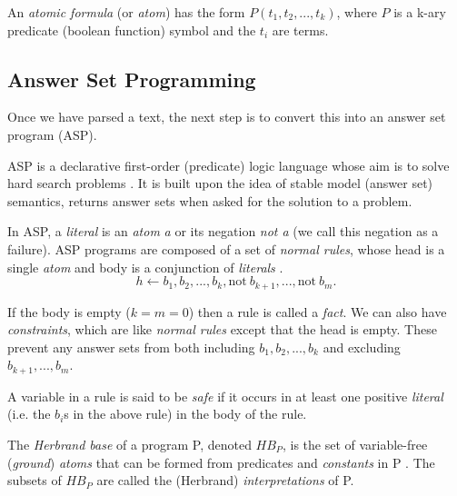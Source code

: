 \begin{definition}
An \textit{atomic formula} (or \textit{atom}) has the form $P(t_1,t_2,...,t_k)$, where $P$ is a k-ary predicate (boolean function) symbol and the $t_i$ are terms.
\end{definition}

\subsection{Answer Set Programming}

Once we have parsed a text, the next step is to convert this into an answer set program (ASP).

ASP is a declarative first-order (predicate) logic language whose aim is to solve hard search problems \cite{lifschitz_what_nodate}. It is built upon the idea of stable model (answer set) semantics, returns answer sets when asked for the solution to a problem.

In ASP, a \textit{literal} is an \textit{atom} \textit{a} or its negation \textit{not a} (we call this negation as a failure). ASP programs are composed of a set of \textit{normal rules}, whose head is a single \textit{atom} and body is a conjunction of \textit{literals} \cite{law_representing_2019}.
\begin{equation}
h \leftarrow b_1, b_2, ..., b_k, \text{not}\ b_{k+1}, ..., \text{not}\ b_m.
\end{equation}

If the body is empty ($k = m = 0$) then a rule is called a \textit{fact}. We can also have \textit{constraints}, which are like \textit{normal rules} except that the head is empty. These prevent any answer sets from both including $b_1, b_2, ..., b_k$ and excluding $b_{k+1}, ..., b_m$.

\begin{definition}
A variable in a rule is said to be \textit{safe} if it occurs in at least one positive \textit{literal} (i.e. the $b_i$s in the above rule) in the body of the rule.
\end{definition}

\begin{definition}
The \textit{Herbrand base} of a program P, denoted $HB_P$, is the set of variable-free (\textit{ground}) \textit{atoms} that can be formed from predicates and \textit{constants} in P . The subsets of $HB_P$ are called the (Herbrand) \textit{interpretations} of P.
\end{definition}

